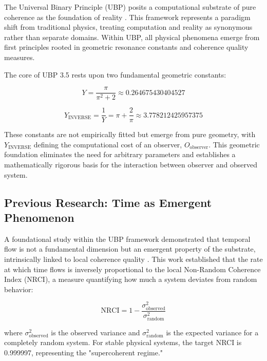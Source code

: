 \documentclass[12pt, a4paper]{article}
\begin{document}
The Universal Binary Principle (UBP) posits a computational substrate of pure coherence as the foundation of reality \cite{ubp_repo}. This framework represents a paradigm shift from traditional physics, treating computation and reality as synonymous rather than separate domains. Within UBP, all physical phenomena emerge from first principles rooted in geometric resonance constants and coherence quality measures.

The core of UBP 3.5 rests upon two fundamental geometric constants:

\begin{equation}
Y = \frac{\pi}{\pi^2 + 2} \approx 0.264675430404527
\end{equation}

\begin{equation}
Y_{\text{INVERSE}} = \frac{1}{Y} = \pi + \frac{2}{\pi} \approx 3.778212425957375
\end{equation}

These constants are not empirically fitted but emerge from pure geometry, with $Y_{\text{INVERSE}}$ defining the computational cost of an observer, $O_{\text{observer}}$. This geometric foundation eliminates the need for arbitrary parameters and establishes a mathematically rigorous basis for the interaction between observer and observed system.

\subsection{Previous Research: Time as Emergent Phenomenon}

A foundational study within the UBP framework demonstrated that temporal flow is not a fundamental dimension but an emergent property of the substrate, intrinsically linked to local coherence quality \cite{time_study}. This work established that the rate at which time flows is inversely proportional to the local Non-Random Coherence Index (NRCI), a measure quantifying how much a system deviates from random behavior:

\begin{equation}
\text{NRCI} = 1 - \frac{\sigma_{\text{observed}}^2}{\sigma_{\text{random}}^2}
\end{equation}

where $\sigma_{\text{observed}}^2$ is the observed variance and $\sigma_{\text{random}}^2$ is the expected variance for a completely random system. For stable physical systems, the target NRCI is 0.999997, representing the "supercoherent regime."
\end{document}

